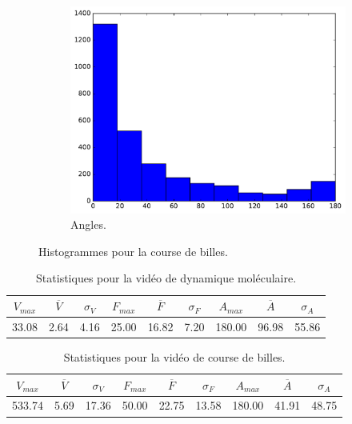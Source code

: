 \begin{figure}[htb]
\begin{subfigure}[t]{\subImgWclicks}
			\includegraphics[width=\textwidth]{figures/ch3/bille_angle}
			\caption{Angles.}
			\label{fig:bille_angle}
		\end{subfigure}
		\caption[Histogrammes pour la course de billes]{Histogrammes pour la course de billes.}
		\label{fig:histBille}
	\end{figure}
	
\begin{table}
	\centering
	\begin{tabular}{c c c c c c c c c}
		$V_{max}$	& $\overline{V}$	& $\sigma_{V}$	& $F_{max}$	& $\overline{F}$	& $\sigma_{F}$	& $A_{max}$	& $\overline{A}$	& $\sigma_{A}$	\bigstrut[b] \\ \hline

		33.08		& 2.64				& 4.16			& 25.00		& 16.82				& 7.20			& 180.00	& 96.98				& 55.86			\bigstrut[t] \\
	\end{tabular}
	\caption[Statistiques pour la vidéo de dynamique moléculaire]{Statistiques pour la vidéo de dynamique moléculaire.}
	\label{tab:atom_stats}
\end{table}

\begin{table}
	\centering
	\begin{tabular}{c c c c c c c c c}
		$V_{max}$	& $\overline{V}$	& $\sigma_{V}$	& $F_{max}$	& $\overline{F}$	& $\sigma_{F}$	& $A_{max}$	& $\overline{A}$	& $\sigma_{A}$	\bigstrut[b] \\ \hline

		533.74		& 5.69				& 17.36			& 50.00		& 22.75				& 13.58			& 180.00	& 41.91				& 48.75			\bigstrut[t] \\
	\end{tabular}
	\caption[Statistiques pour la vidéo de course de billes]{Statistiques pour la vidéo de course de billes.}
	\label{tab:bille_stats}
\end{table}

